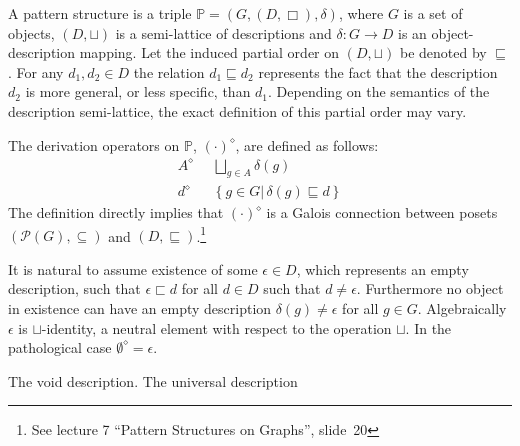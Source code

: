 \documentclass[a4paper]{article}
\newcommand{\obj}[1]{{\left\{ #1 \right \}}}
\newcommand{\brac}[1]{{\left ( #1 \right )}}
\newcommand{\induc}[1]{{\left . #1 \right \vert}}
\newcommand{\Pwr}{\mathcal{P}}
\newcommand{\Pat}{\mathbb{P}}
\newcommand{\defn}{\mathop{\overset{\Delta}{=}}\nolimits}
\begin{document}
A pattern structure is a triple $\Pat=\brac{G,(D,\Box), \delta}$, where $G$ is a set of objects, $(D,\sqcup)$ is a semi-lattice of descriptions and $\delta: G\to D$ is an object-description mapping. Let the induced partial order on $(D,\sqcup)$ be denoted by $\sqsubseteq$. For any $d_1, d_2\in D$ the relation $d_1\sqsubseteq d_2$ represents the fact that the description $d_2$ is more general, or less specific, than $d_1$. Depending on the semantics of the description semi-lattice, the exact definition of this partial order may vary.

The derivation operators on $\Pat$, ${(\cdot)}^\diamond$, are defined as follows: \begin{align*}
	A^\diamond &\defn \bigsqcup_{g\in A} \delta(g)\\
	d^\diamond &\defn \obj{\induc{g\in G}\,\delta(g) \sqsubseteq d}
\end{align*}
The definition directly implies that ${(\cdot)}^\diamond$ is a Galois connection between posets $\brac{\Pwr(G),\subseteq}$ and $(D,\sqsubseteq)$.\footnote{See lecture 7 ``Pattern Structures on Graphs'', slide~20}



It is natural to assume existence of some $\epsilon \in D$, which represents an empty description, such that $\epsilon \sqsubset d$ for all $d\in D$ such that $d\neq \epsilon$. Furthermore no object in existence can have an empty description $\delta(g)\neq \epsilon$ for all $g\in G$. Algebraically $\epsilon$ is $\sqcup$-identity, a neutral element with respect to the operation $\sqcup$. In the pathological case $\emptyset^\diamond=\epsilon$.

The void description. The universal description

\end{document}
